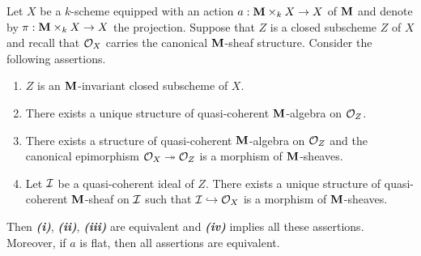 \begin{proposition}\label{proposition:invariant_closed_subschemes}
Let $X$ be a $k$-scheme equipped with an action $a:\mathbf{M}\times_kX\rightarrow X$ of $\mathbf{M}$ and denote by $\pi:\mathbf{M}\times_kX\rightarrow X$ the projection. Suppose that $Z$ is a closed subscheme $Z$ of $X$ and recall that ${\mathcal O}_X$ carries the canonical $\mathbf{M}$-sheaf structure. Consider the following assertions.
\begin{enumerate}[label= \emph{\textbf{(\roman*)}}, leftmargin=3.0em]
\item $Z$ is an $\mathbf{M}$-invariant closed subscheme of $X$.
\item There exists a unique structure of quasi-coherent $\mathbf{M}$-algebra on ${\mathcal O}_Z$.
\item There exists a structure of quasi-coherent $\mathbf{M}$-algebra on ${\mathcal O}_Z$ and the canonical epimorphism ${\mathcal O}_X\twoheadrightarrow {\mathcal O}_Z$ is a morphism of $\mathbf{M}$-sheaves.
\item Let ${\mathcal I}$ be a quasi-coherent ideal of $Z$. There exists a unique structure of quasi-coherent $\mathbf{M}$-sheaf on ${\mathcal I}$ such that ${\mathcal I}\hookrightarrow {\mathcal O}_X$ is a morphism of $\mathbf{M}$-sheaves.
\end{enumerate}
Then \emph{\textbf{(i)}}, \emph{\textbf{(ii)}}, \emph{\textbf{(iii)}} are equivalent and \emph{\textbf{(iv)}} implies all these assertions. Moreover, if $a$ is flat, then all assertions are equivalent.
\end{proposition}
